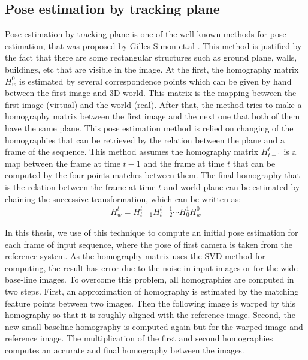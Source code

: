 \subsection{Pose estimation by tracking plane}\label{subsec:pose_estimation_planer_tracking}
Pose estimation by tracking plane is one of the well-known methods for pose estimation, that was proposed by Gilles Simon et.al \cite{genc2002marker}. This method is justified by the fact that there are some rectangular structures such as ground plane, walls, buildings, etc that are visible in the image. At the first, the homography matrix $H_{w}^{0}$ is estimated by several correspondence points which can be given by hand between the first image and 3D world. This matrix is the mapping between the first image (virtual) and the world (real). After that, the method tries to make a homography matrix between the first image and the next one that both of them have the same plane. This pose estimation method is relied on changing of the homographies that can be retrieved by the relation between the plane and a frame of the sequence. This method assumes the homography matrix $H_{t-1}^{t}$ is a map between the frame at time $t-1$ and the frame at time $t$ that can be computed by the four points matches between them. The final homography that is the relation between the frame at time $t$ and world plane can be estimated by chaining the successive transformation, which can be written as:
\begin{gather*}
	H_{w}^{t} = H_{t-1}^{t} H_{t-2}^{t-1} \cdots H_{0}^{1} H_{w}^{0}
\end{gather*}\label{eq:homography_world_to_refrence}

In this thesis, we use of this technique to compute an initial pose estimation for each frame of input sequence, where the pose of first camera is taken from the reference system. As the homography matrix uses the SVD method for computing, the result has error due to the noise in input images or for the wide base-line images. To overcome this problem, all homographies are computed in two steps. First, an approximation of homography is estimated by the matching feature points between two images. Then the following image is warped by this homography so that it is roughly aligned with the reference image. Second, the new small baseline homography is computed again but for the warped image and reference image. The multiplication of the first and second homographies computes an accurate and final homography between the images.
